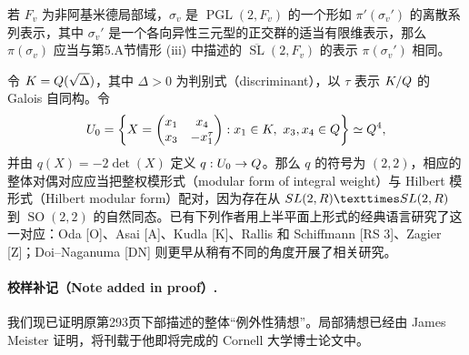 若 $F_v$ 为非阿基米德局部域，$\sigma_v$ 是 $\operatorname{PGL}(2,F_v)$ 的一个形如 $\pi'(\sigma_v')$ 的离散系列表示，其中 $\sigma_v'$ 是一个各向异性三元型的正交群的适当有限维表示，那么 $\pi(\sigma_v)$ 应当与第5.A节情形 (iii) 中描述的 $\overline{\operatorname{SL}}(2,F_v)$ 的表示 $\pi(\sigma_v')$ 相同。

令 $K=Q(\sqrt\Delta)$，其中 $\Delta>0$ 为判别式（discriminant），以 $\tau$ 表示 $K/Q$ 的 Galois 自同构。令
\[
 U_0=\left\{X=\begin{pmatrix}x_1&x_4\\x_3&-x_1^\tau\end{pmatrix}
 :x_1\in K,\ x_3,x_4\in Q\right\}\simeq Q^4,
\]
并由 $q(X)=-2\det(X)$ 定义 $q:U_0\to Q$。那么 $q$ 的符号为 $(2,2)$，相应的整体对偶对应应当把整权模形式（modular form of integral weight）与 Hilbert 模形式（Hilbert modular form）配对，因为存在从 $\operatorname{SL}(2,\R)\times\operatorname{SL}(2,\R)$ 到 $\operatorname{SO}(2,2)$ 的自然同态。已有下列作者用上半平面上形式的经典语言研究了这一对应：Oda [O]、Asai [A]、Kudla [K]、Rallis 和 Schiffmann [RS 3]、Zagier [Z]；Doi--Naganuma [DN] 则更早从稍有不同的角度开展了相关研究。

\paragraph*{校样补记（Note added in proof）.}
我们现已证明原第293页下部描述的整体“例外性猜想”。局部猜想已经由 James Meister 证明，将刊载于他即将完成的 Cornell 大学博士论文中。

